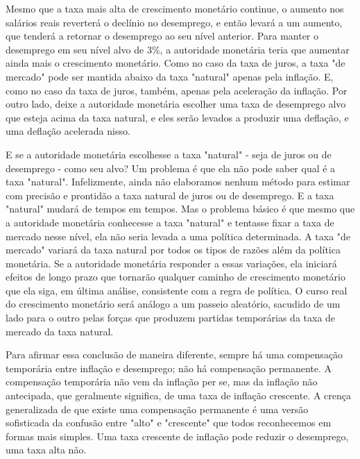\documentclass[12pt]{article}
\begin{document}
Mesmo que a taxa mais alta de crescimento monetário continue, o aumento nos salários reais reverterá o declínio no desemprego, e então levará a um aumento, que tenderá a retornar o desemprego ao seu nível anterior. Para manter o desemprego em seu nível alvo de 3\%, a autoridade monetária teria que aumentar ainda mais o crescimento monetário. Como no caso da taxa de juros, a taxa "de mercado" pode ser mantida abaixo da taxa "natural" apenas pela inflação. E, como no caso da taxa de juros, também, apenas pela aceleração da inflação. Por outro lado, deixe a autoridade monetária escolher uma taxa de desemprego alvo que esteja acima da taxa natural, e eles serão levados a produzir uma deflação, e uma deflação acelerada nisso.

E se a autoridade monetária escolhesse a taxa "natural" - seja de juros ou de desemprego - como seu alvo? Um problema é que ela não pode saber qual é a taxa "natural". Infelizmente, ainda não elaboramos nenhum método para estimar com precisão e prontidão a taxa natural de juros ou de desemprego. E a taxa "natural" mudará de tempos em tempos. Mas o problema básico é que mesmo que a autoridade monetária conhecesse a taxa "natural" e tentasse fixar a taxa de mercado nesse nível, ela não seria levada a uma política determinada. A taxa "de mercado" variará da taxa natural por todos os tipos de razões além da política monetária. Se a autoridade monetária responder a essas variações, ela iniciará efeitos de longo prazo que tornarão qualquer caminho de crescimento monetário que ela siga, em última análise, consistente com a regra de política. O curso real do crescimento monetário será análogo a um passeio aleatório, sacudido de um lado para o outro pelas forças que produzem partidas temporárias da taxa de mercado da taxa natural.

Para afirmar essa conclusão de maneira diferente, sempre há uma compensação temporária entre inflação e desemprego; não há compensação permanente. A compensação temporária não vem da inflação per se, mas da inflação não antecipada, que geralmente significa, de uma taxa de inflação crescente. A crença generalizada de que existe uma compensação permanente é uma versão sofisticada da confusão entre "alto" e "crescente" que todos reconhecemos em formas mais simples. Uma taxa crescente de inflação pode reduzir o desemprego, uma taxa alta não.
\end{document}
